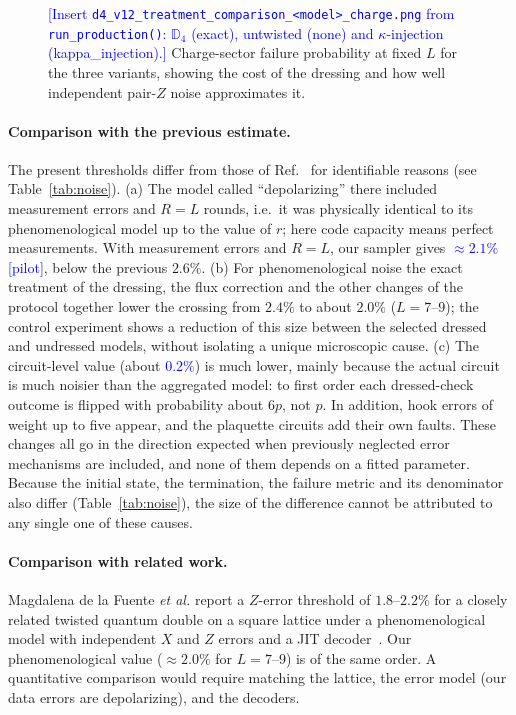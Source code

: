 \documentclass[a4paper]{article}
\newcommand{\blue}[1]{\textcolor{blue}{#1}}
\begin{document}
\begin{figure}[t]
  \centering
  \fbox{\rule{0pt}{50mm}\rule{0.82\linewidth}{0pt}}
  \caption{\blue{[Insert \texttt{d4\_v12\_treatment\_comparison\_<model>\_charge.png} from \texttt{run\_production()}: $\mathbb{D}_4$ (exact), untwisted (none) and $\kappa$-injection (kappa\_injection).]} Charge-sector failure probability at fixed $L$ for the three variants, showing the cost of the dressing and how well independent pair-$Z$ noise approximates it.}
  \label{fig:control}
\end{figure}

\paragraph{Comparison with the previous estimate.}
The present thresholds differ from those of Ref.~\cite{haga2026aqis} for identifiable reasons (see Table~\ref{tab:noise}). (a) The model called ``depolarizing'' there included measurement errors and $R=L$ rounds, i.e.\ it was physically identical to its phenomenological model up to the value of $r$; here code capacity means perfect measurements. With measurement errors and $R=L$, our sampler gives \blue{$\approx2.1\%$ [pilot]}, below the previous $2.6\%$. (b) For phenomenological noise the exact treatment of the dressing, the flux correction and the other changes of the protocol together lower the crossing from $2.4\%$ to about $2.0\%$ ($L=7$--$9$); the control experiment shows a reduction of this size between the selected dressed and undressed models, without isolating a unique microscopic cause. (c) The circuit-level value (about \blue{$0.2\%$}) is much lower, mainly because the actual circuit is much noisier than the aggregated model: to first order each dressed-check outcome is flipped with probability about $6p$, not $p$. In addition, hook errors of weight up to five appear, and the plaquette circuits add their own faults. These changes all go in the direction expected when previously neglected error mechanisms are included, and none of them depends on a fitted parameter. Because the initial state, the termination, the failure metric and its denominator also differ (Table~\ref{tab:noise}), the size of the difference cannot be attributed to any single one of these causes.

\paragraph{Comparison with related work.}
Magdalena de la Fuente \emph{et al.} report a $Z$-error threshold of $1.8$--$2.2\%$ for a closely related twisted quantum double on a square lattice under a phenomenological model with independent $X$ and $Z$ errors and a JIT decoder~\cite{magdalena2026}. Our phenomenological value ($\approx2.0\%$ for $L=7$--$9$) is of the same order. A quantitative comparison would require matching the lattice, the error model (our data errors are depolarizing), and the decoders.
\end{document}
